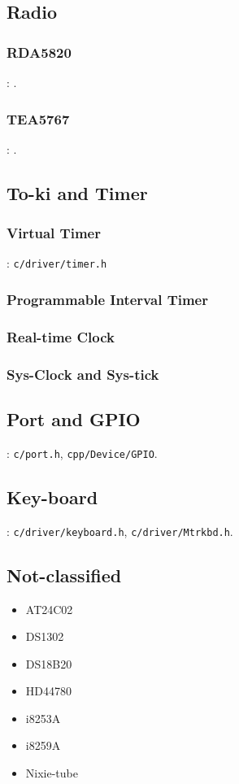 \subsection{Radio}

\subsubsection{RDA5820}

: .

\subsubsection{TEA5767}

: .

\subsection{To-ki and Timer}
\subsubsection{Virtual Timer}
: \verb`c/driver/timer.h`

\subsubsection{Programmable Interval Timer}
\subsubsection{Real-time Clock}
\subsubsection{Sys-Clock and Sys-tick}

\subsection{Port and GPIO}
: \verb`c/port.h`, \verb`cpp/Device/GPIO`.


\subsection{Key-board}
: \verb`c/driver/keyboard.h`, \verb`c/driver/Mtrkbd.h`.

\subsection{Not-classified}
\begin{itemize}
\item AT24C02
\item DS1302
\item DS18B20
\item HD44780
\item i8253A
\item i8259A
\item Nixie-tube
\end{itemize}


